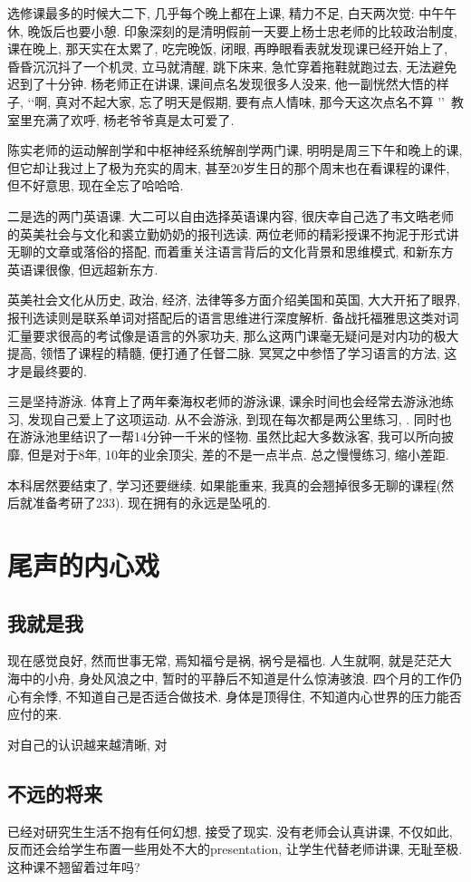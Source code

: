 \documentclass[a4paper, UTF8,  12pt]{article}
\begin{document}
选修课最多的时候大二下, 几乎每个晚上都在上课, 精力不足, 白天两次觉: 中午午休, 晚饭后也要小憩. 印象深刻的是清明假前一天要上杨士忠老师的比较政治制度, 课在晚上, 那天实在太累了, 吃完晚饭, 闭眼, 再睁眼看表就发现课已经开始上了, 昏昏沉沉抖了一个机灵, 立马就清醒, 跳下床来, 急忙穿着拖鞋就跑过去, 无法避免迟到了十分钟. 杨老师正在讲课, 课间点名发现很多人没来, 他一副恍然大悟的样子, \lq\lq 啊, 真对不起大家, 忘了明天是假期, 要有点人情味, 那今天这次点名不算 \rq\rq\ 教室里充满了欢呼, 杨老爷爷真是太可爱了. 

陈实老师的运动解剖学和中枢神经系统解剖学两门课, 明明是周三下午和晚上的课, 但它却让我过上了极为充实的周末, 甚至20岁生日的那个周末也在看课程的课件, 但不好意思, 现在全忘了哈哈哈.

二是选的两门英语课. 大二可以自由选择英语课内容, 很庆幸自己选了韦文晧老师的英美社会与文化和裘立勤奶奶的报刊选读. 两位老师的精彩授课不拘泥于形式讲无聊的文章或落俗的搭配, 而着重关注语言背后的文化背景和思维模式, 和新东方英语课很像, 但远超新东方. 

英美社会文化从历史, 政治, 经济, 法律等多方面介绍美国和英国, 大大开拓了眼界, 报刊选读则是联系单词对搭配后的语言思维进行深度解析. 备战托福雅思这类对词汇量要求很高的考试像是语言的外家功夫, 那么这两门课毫无疑问是对内功的极大提高, 领悟了课程的精髓, 便打通了任督二脉. 冥冥之中参悟了学习语言的方法, 这才是最终要的.

三是坚持游泳. 体育上了两年秦海权老师的游泳课, 课余时间也会经常去游泳池练习, 发现自己爱上了这项运动. 从不会游泳, 到现在每次都是两公里练习, . 同时也在游泳池里结识了一帮14分钟一千米的怪物. 虽然比起大多数泳客, 我可以所向披靡, 但是对于8年, 10年的业余顶尖, 差的不是一点半点. 总之慢慢练习, 缩小差距.

本科居然要结束了, 学习还要继续. 如果能重来, 我真的会翘掉很多无聊的课程(然后就准备考研了233). 现在拥有的永远是坠吼的.

\newpage
\section{尾声的内心戏}
\subsection{我就是我}

现在感觉良好, 然而世事无常, 焉知福兮是祸, 祸兮是福也. 人生就啊, 就是茫茫大海中的小舟, 身处风浪之中, 暂时的平静后不知道是什么惊涛骇浪. 四个月的工作仍心有余悸, 不知道自己是否适合做技术. 身体是顶得住, 不知道内心世界的压力能否应付的来. 

对自己的认识越来越清晰, 对
\subsection{不远的将来}

已经对研究生生活不抱有任何幻想, 接受了现实. 没有老师会认真讲课, 不仅如此, 反而还会给学生布置一些用处不大的presentation, 让学生代替老师讲课, 无耻至极. 这种课不翘留着过年吗?
\end{document}
